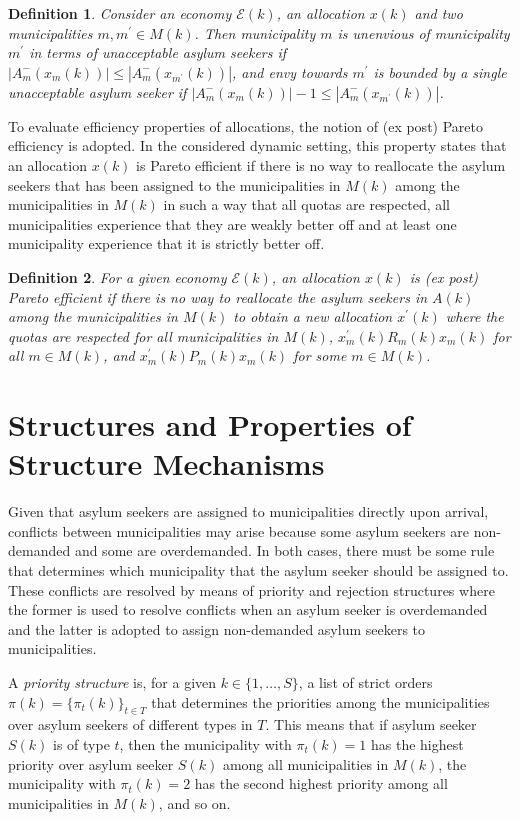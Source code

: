 \documentclass[12pt,fleqn]{article}
\newtheorem{definition}{Definition}
\begin{document}
\begin{definition}\rm\label{DEF:1-Envy_UNACC}
Consider an economy $\mathcal{E}(k)$, an allocation $x(k)$ and two municipalities $m,m^\prime\in M(k)$. Then municipality $m$ is unenvious of municipality $m^\prime$ in terms of unacceptable asylum seekers if $|A_m^-(x_m(k))|\leq |A_m^-(x_{m^\prime}(k))|$, and envy towards $m^\prime$ is bounded by a single unacceptable asylum seeker if $|A_m^-(x_m(k))|-1\leq |A_m^-(x_{m^\prime}(k))|$.
\end{definition}
\noindent To evaluate efficiency properties of allocations, the notion of (ex post) Pareto efficiency is adopted. In the considered dynamic setting, this property states that an allocation $x(k)$ is Pareto efficient if there is no way to reallocate the asylum seekers that has been assigned to the municipalities in $M(k)$ among the municipalities in $M(k)$ in such a way that all quotas are respected, all municipalities experience that they are weakly better off and at least one municipality experience that it is strictly better off.
\begin{definition}\rm\label{DEF:Efficiency}
For a given economy $\mathcal{E}(k)$, an allocation $x(k)$ is (ex post) Pareto efficient if there is no way to reallocate the asylum seekers in $A(k)$ among the municipalities in $M(k)$ to obtain a new allocation $x^\prime(k)$ where the quotas are respected for all municipalities in $M(k)$, $x_m^\prime(k)R_m(k) x_m(k)$ for all $m\in M(k)$, and $x_m^\prime(k)P_m(k) x_m(k)$ for some $m\in M(k)$.
\end{definition}

\section{Structures and Properties of Structure Mechanisms}\label{SEC:Structure_Mechanisms}
Given that asylum seekers are assigned to municipalities directly upon arrival, conflicts between municipalities may arise because some asylum seekers are non-demanded and some are overdemanded. In both cases, there must be some rule that determines which municipality that the asylum seeker should be assigned to. These conflicts are resolved by means of priority and rejection structures where the former is used to resolve conflicts when an asylum seeker is overdemanded and the latter is adopted to assign non-demanded asylum seekers to municipalities.

A \emph{priority structure} is, for a given $k\in\{1,\ldots,S\}$, a list of strict orders $\pi(k)=\{\pi_t(k)\}_{t\in T}$ that determines the priorities among the municipalities over asylum seekers of different types in $T$. This means that if asylum seeker $S(k)$ is of type $t$, then the municipality with $\pi_t(k)=1$ has the highest priority over asylum seeker $S(k)$ among all municipalities in $M(k)$, the municipality with $\pi_t(k)=2$ has the second highest priority among all municipalities in $M(k)$, and so on.
\end{document}
